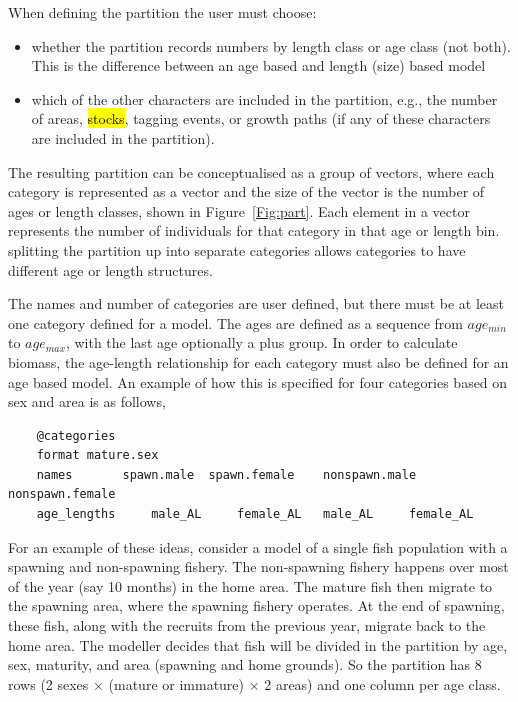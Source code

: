 When defining the partition the user must choose:
\begin{itemize}
\item	whether the partition records numbers by length class or age class (not both). This is the difference between an age based and length (size) based model
\item	which of the other characters are included in the partition, e.g., the number of areas, \hl{stocks}, tagging events, or growth paths (if any of these characters are included in the partition).
\end{itemize}

The resulting partition can be conceptualised as a group of vectors, where each category is represented as a vector and the size of the vector is the number of ages or length classes, shown in Figure~\ref{Fig:part}. Each element in a vector represents the number of individuals for that category in that age or length bin. splitting the partition up into separate categories allows categories to have different age or length structures.
	
The names and number of categories are user defined, but there must be at least one category defined for a model. The ages are defined as a sequence from $age_{min}$ to $age_{max}$, with the last age optionally a plus group. In order to calculate biomass, the age-length relationship for each category must also be defined for an age based model. An example of how this is specified for four categories based on sex and area is as follows,
{\small{\begin{verbatim}
	@categories 
	format mature.sex
	names 		spawn.male 	spawn.female 	nonspawn.male 	nonspawn.female
	age_lengths 	male_AL		female_AL   male_AL		female_AL  
		\end{verbatim}}}	

For an example of these ideas, consider a model of a single fish population with a spawning and non-spawning fishery. The non-spawning fishery happens over most of the year (say 10 months) in the home area. The mature fish then migrate to the spawning area, where the spawning fishery operates. At the end of spawning, these fish, along with the recruits from the previous year, migrate back to the home area. The modeller decides that fish will be divided in the partition by age, sex, maturity, and area (spawning and home grounds). So the partition has 8 rows (2 sexes × (mature or immature) × 2 areas) and one column per age class. 

